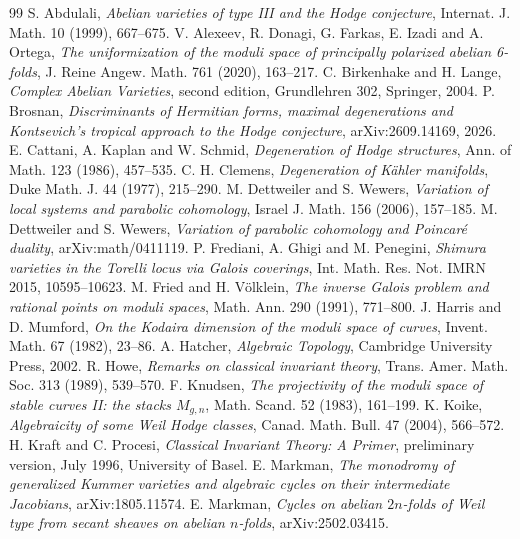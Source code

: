 \documentclass[11pt]{amsart}
\theoremstyle{definition}
\theoremstyle{remark}
\begin{document}
\begin{thebibliography}{99}
 S. Abdulali, \emph{Abelian varieties of type III and the Hodge conjecture}, Internat. J. Math. 10 (1999), 667--675.
 V. Alexeev, R. Donagi, G. Farkas, E. Izadi and A. Ortega, \emph{The uniformization of the moduli space of principally polarized abelian 6-folds}, J. Reine Angew. Math. 761 (2020), 163--217.
 C. Birkenhake and H. Lange, \emph{Complex Abelian Varieties}, second edition, Grundlehren 302, Springer, 2004.
 P. Brosnan, \emph{Discriminants of Hermitian forms, maximal degenerations and Kontsevich's tropical approach to the Hodge conjecture}, arXiv:2609.14169, 2026.
 E. Cattani, A. Kaplan and W. Schmid, \emph{Degeneration of Hodge structures}, Ann. of Math. 123 (1986), 457--535.
 C. H. Clemens, \emph{Degeneration of K\"ahler manifolds}, Duke Math. J. 44 (1977), 215--290.
 M. Dettweiler and S. Wewers, \emph{Variation of local systems and parabolic cohomology}, Israel J. Math. 156 (2006), 157--185.
 M. Dettweiler and S. Wewers, \emph{Variation of parabolic cohomology and Poincar\'e duality}, arXiv:math/0411119.
 P. Frediani, A. Ghigi and M. Penegini, \emph{Shimura varieties in the Torelli locus via Galois coverings}, Int. Math. Res. Not. IMRN 2015, 10595--10623.
 M. Fried and H. V\"olklein, \emph{The inverse Galois problem and rational points on moduli spaces}, Math. Ann. 290 (1991), 771--800.
 J. Harris and D. Mumford, \emph{On the Kodaira dimension of the moduli space of curves}, Invent. Math. 67 (1982), 23--86.
 A. Hatcher, \emph{Algebraic Topology}, Cambridge University Press, 2002.
 R. Howe, \emph{Remarks on classical invariant theory}, Trans. Amer. Math. Soc. 313 (1989), 539--570.
 F. Knudsen, \emph{The projectivity of the moduli space of stable curves II: the stacks $M_{g,n}$}, Math. Scand. 52 (1983), 161--199.
 K. Koike, \emph{Algebraicity of some Weil Hodge classes}, Canad. Math. Bull. 47 (2004), 566--572.
 H. Kraft and C. Procesi, \emph{Classical Invariant Theory: A Primer}, preliminary version, July 1996, University of Basel.
 E. Markman, \emph{The monodromy of generalized Kummer varieties and algebraic cycles on their intermediate Jacobians}, arXiv:1805.11574.
 E. Markman, \emph{Cycles on abelian $2n$-folds of Weil type from secant sheaves on abelian $n$-folds}, arXiv:2502.03415.

\end{thebibliography}
\end{document}
